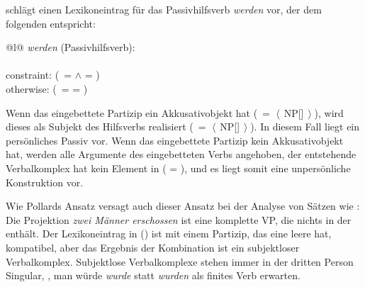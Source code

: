 {\citet[]{Kathol94a} schlägt einen Lexikoneintrag für
das Passivhilfsverb \emph{werden} vor, der dem folgenden entspricht:

\ea
\begin{tabular}[t]{@{}l@{}}
\emph{werden} (Passivhilfsverb):\\
\\
constraint: (\, =  $\wedge$  = )\\[2mm]
otherwise: (\, =  = \liste{})
\end{tabular}
\z
Wenn das eingebettete Partizip ein Akkusativobjekt hat 
(\, = $\left\langle\right.$\,NP[]\,$\left.\right\rangle$), 
wird dieses als Subjekt des Hilfsverbs realisiert
(\, = $\left\langle\right.$\,NP[]\,$\left.\right\rangle$).
In diesem Fall liegt ein persönliches Passiv vor. Wenn das eingebettete Partizip kein Akkusativobjekt hat,
werden alle Argumente des eingebetteten Verbs  angehoben, der entstehende Verbalkomplex
hat kein Element in \subj ( = \eliste{}), und es liegt somit eine unpersönliche Konstruktion vor.

Wie Pollards Ansatz versagt auch dieser Ansatz bei der Analyse von Sätzen
wie : Die Projektion \emph{zwei Männer
erschossen} ist eine komplette VP, die nichts in der \compsl enthält.
Der Lexikoneintrag in () ist mit einem Partizip, das eine leere \compsl hat, kompatibel,
aber das Ergebnis der Kombination ist ein subjektloser Verbalkomplex.
Subjektlose Verbalkomplexe stehen immer in der dritten Person Singular, 
\dash, man würde \emph{wurde} statt \emph{wurden} als finites Verb erwarten.

%
%



}
